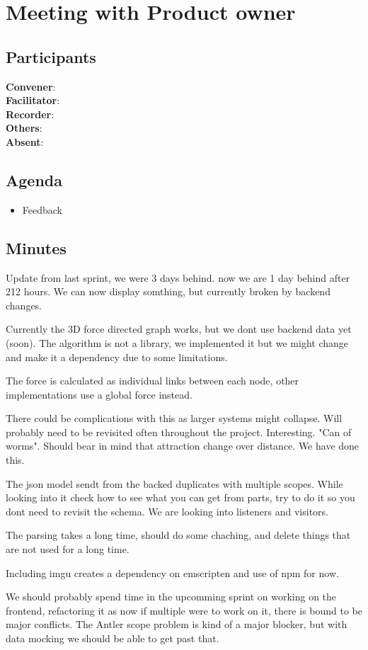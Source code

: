 \section*{Meeting with Product owner}

\subsection*{Participants}
\textbf{Convener}: \productowner{}\\
\textbf{Facilitator}: \facilitator{}  \\
\textbf{Recorder}: \scrummaster{}  \\
\textbf{Others}: \groupleader{} \\
\textbf{Absent}: 

\subsection*{Agenda}
\begin{itemize}
    \item Feedback
\end{itemize}

\subsection*{Minutes}
Update from last sprint, we were 3 days behind. now we are 1 day behind after 212 hours. We can now display somthing, but currently broken by backend changes. 

Currently the 3D force directed graph works, but we dont use backend data yet (soon).  The algorithm is not a library, we implemented it but we might change and make it a dependency due to some limitations. 

The force is calculated as individual links between each node, other implementations use a global force instead. 

There could be complications with this as larger systems might collapse. Will probably need to be revisited often throughout the project. Interesting. "Can of worms". Should bear in mind that attraction change over distance. We have done this. 

The json model sendt from the backed duplicates with multiple scopes. While looking into it check how to see what you can get from parts, try to do it so you dont need to revisit the schema. We are looking into listeners and visitors. 

The parsing takes a long time, should do some chaching, and delete things that are not used for a long time.

Including imgu creates a dependency on emscripten and use of npm for now.

We should probably spend time in the upcomming sprint on working on the frontend, refactoring it as now if multiple were to work on it, there is bound to be major conflicts. The Antler scope problem is kind of a major blocker, but with data mocking we should be able to get past that.

\newpage